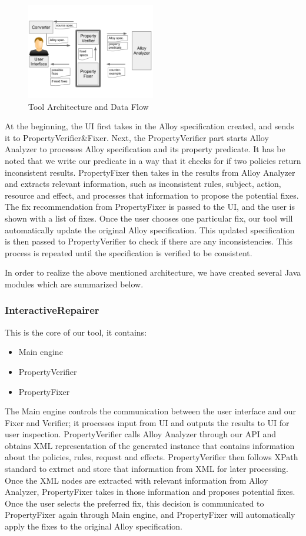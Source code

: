 \documentclass[letterpaper]{acm_proc_article-sp}
\begin{document}
\begin{figure}[h]
\includegraphics[width=0.5\textwidth]{dataflow.png}
\caption{Tool Architecture and Data Flow}    
  \label{fig:Architecture}
\end{figure}

At the beginning, the UI first takes in the Alloy specification created, and sends it to PropertyVerifier\&Fixer. Next, the PropertyVerifier part starts Alloy Analyzer to processes Alloy specification and its property predicate. It has be noted that we write our predicate in a way that it checks for if two policies return inconsistent results. PropertyFixer then takes in the results from Alloy Analyzer and extracts relevant information, such as inconsistent rules, subject, action, resource and effect, and processes that information to propose the potential fixes. The fix recommendation from PropertyFixer is passed to the UI, and the user is shown with a list of fixes. Once the user chooses one particular fix, our tool will automatically update the original Alloy specification. This updated specification is then passed to PropertyVerifier to check if there are any inconsistencies. This process is repeated until the specification is verified to be consistent.

In order to realize the above mentioned architecture, we have created several Java modules which are summarized below.

\subsubsection{InteractiveRepairer}
This is the core of our tool, it contains:
\begin{itemize}
\item Main engine
\item PropertyVerifier
\item PropertyFixer
\end{itemize}
The Main engine controls the communication between the user interface and our Fixer and Verifier; it processes input from UI and outputs the results to UI for user inspection. PropertyVerifier calls Alloy Analyzer through our API and obtains XML representation of the generated instance that contains information about the policies, rules, request and effects. PropertyVerifier then follows XPath standard to extract and store that information from XML for later processing. Once the XML nodes are extracted with relevant information from Alloy Analyzer, PropertyFixer takes in those information and proposes potential fixes. Once the user selects the preferred fix, this decision is communicated to PropertyFixer again through Main engine, and PropertyFixer will automatically apply the fixes to the original Alloy specification.
\end{document}

